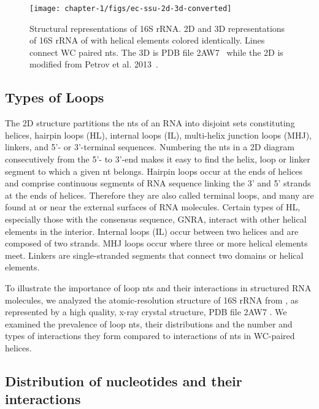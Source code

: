 \begin{landscape}
  \begin{figure}
    \texttt{[image: chapter-1/figs/ec-ssu-2d-3d-converted]}
    \caption{Structural representations of \EC{} 16S rRNA\@. 2D and 3D
      representations of 16S rRNA of \EC{} with helical elements colored
      identically. Lines connect WC paired nts. The 3D is PDB file
      2AW7~\cite{Schuwirth2005} while the 2D is modified from Petrov et al.
      2013~\cite{Petrov2013a}.}
\label{fig:ec-ssu-2d-3d}
  \end{figure}
\end{landscape}

\subsection{Types of Loops }

The 2D structure partitions the nts of an RNA into disjoint sets constituting
helices, hairpin loops (HL), internal loops (IL), multi-helix junction loops
(MHJ), linkers, and 5’- or 3’-terminal sequences. Numbering the nts in a 2D
diagram consecutively from the 5’- to 3’-end makes it easy to find the helix,
loop or linker segment to which a given nt belongs. Hairpin loops occur at the
ends of helices and comprise continuous segments of RNA sequence linking the 3’
and 5’ strands at the ends of helices. Therefore they are also called terminal
loops, and many are found at or near the external surfaces of RNA molecules.
Certain types of HL, especially those with the consensus sequence, GNRA,
interact with other helical elements in the interior. Internal loops (IL) occur
between two helices and are composed of two strands. MHJ loops occur where three
or more helical elements meet. Linkers are single-stranded segments that connect
two domains or helical elements. 

To illustrate the importance of loop nts and their interactions in structured
RNA molecules, we analyzed the atomic-resolution structure of 16S rRNA from \EC,
as represented by a high quality, x-ray crystal structure, PDB file 2AW7
\cite{Schuwirth2005}. We examined the prevalence of loop nts, their
distributions and the number and types of interactions they form compared to
interactions of nts in WC-paired helices. 

\subsection{Distribution of nucleotides and their interactions}

